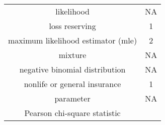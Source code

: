 \documentclass[]{book}
\begin{document}
\begin{longtable}[]{@{}cc@{}}
\begin{minipage}[t]{0.43\columnwidth}\centering\strut
likelihood\strut
\end{minipage} & \begin{minipage}[t]{0.05\columnwidth}\centering\strut
NA\strut
\end{minipage}\tabularnewline
\begin{minipage}[t]{0.43\columnwidth}\centering\strut
loss reserving\strut
\end{minipage} & \begin{minipage}[t]{0.05\columnwidth}\centering\strut
1\strut
\end{minipage}\tabularnewline
\begin{minipage}[t]{0.43\columnwidth}\centering\strut
maximum likelihood estimator (mle)\strut
\end{minipage} & \begin{minipage}[t]{0.05\columnwidth}\centering\strut
2\strut
\end{minipage}\tabularnewline
\begin{minipage}[t]{0.43\columnwidth}\centering\strut
mixture\strut
\end{minipage} & \begin{minipage}[t]{0.05\columnwidth}\centering\strut
NA\strut
\end{minipage}\tabularnewline
\begin{minipage}[t]{0.43\columnwidth}\centering\strut
negative binomial distribution\strut
\end{minipage} & \begin{minipage}[t]{0.05\columnwidth}\centering\strut
NA\strut
\end{minipage}\tabularnewline
\begin{minipage}[t]{0.43\columnwidth}\centering\strut
nonlife or general insurance\strut
\end{minipage} & \begin{minipage}[t]{0.05\columnwidth}\centering\strut
1\strut
\end{minipage}\tabularnewline
\begin{minipage}[t]{0.43\columnwidth}\centering\strut
parameter\strut
\end{minipage} & \begin{minipage}[t]{0.05\columnwidth}\centering\strut
NA\strut
\end{minipage}\tabularnewline
\begin{minipage}[t]{0.43\columnwidth}\centering\strut
Pearson chi-square statistic\strut
\end{minipage} & \begin{minipage}[t]{0.05\columnwidth}\centering\strut

\end{minipage}
\end{longtable}
\end{document}
